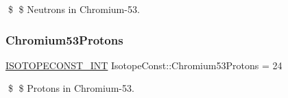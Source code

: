 \$ \$ Neutrons in Chromium-\/53. \mbox{\label{group___isotope_const-_chromium-_cr53_ga22cd0cb1cf83f5e95bc72cafabfe1cd0}} 
\subsubsection{\texorpdfstring{Chromium53\+Protons}{Chromium53Protons}}
{\footnotesize\ttfamily \mbox{\hyperlink{group___isotope_const-_macros_ga5f18360b3e99483a35c32d789e62621c}{I\+S\+O\+T\+O\+P\+E\+C\+O\+N\+S\+T\+\_\+\+I\+NT}} Isotope\+Const\+::\+Chromium53\+Protons = 24}

\$ \$ Protons in Chromium-\/53. 
